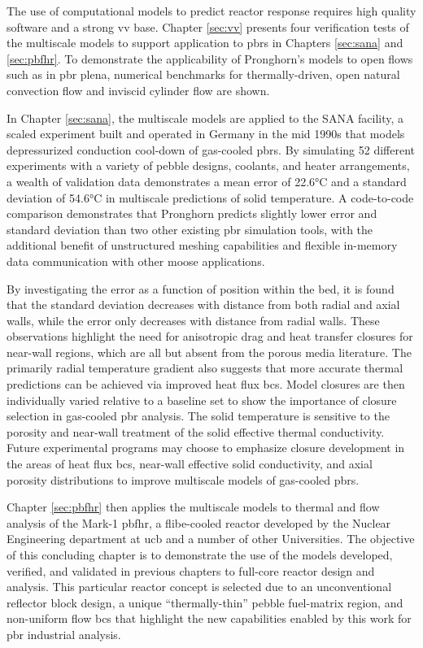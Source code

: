 The use of computational models to predict reactor response requires high quality software and a strong \gls{vv} base. Chapter \ref{sec:vv} presents four verification tests of the multiscale models to support application to \glspl{pbr} in Chapters \ref{sec:sana} and \ref{sec:pbfhr}. To demonstrate the applicability of Pronghorn's models to open flows such as in \gls{pbr} plena, numerical benchmarks for thermally-driven, open natural convection flow and inviscid cylinder flow are shown.

In Chapter \ref{sec:sana}, the multiscale models are applied to the SANA facility, a scaled experiment built and operated in Germany in the mid 1990s that models depressurized conduction cool-down of gas-cooled \glspl{pbr}. By simulating 52 different experiments with a variety of pebble designs, coolants, and heater arrangements, a wealth of validation data demonstrates a mean error of 22.6\si{\celsius} and a standard deviation of 54.6\si{\celsius} in multiscale predictions of solid temperature. A code-to-code comparison demonstrates that Pronghorn predicts slightly lower error and standard deviation than two other existing \gls{pbr} simulation tools, with the additional benefit of unstructured meshing capabilities and flexible in-memory data communication with other \gls{moose} applications.

By investigating the error as a function of position within the bed, it is found that the standard deviation decreases with distance from both radial and axial walls, while the error only decreases with distance from radial walls. These observations highlight the need for anisotropic drag and heat transfer closures for near-wall regions, which are all but absent from the porous media literature. The primarily radial temperature gradient also suggests that more accurate thermal predictions can be achieved via improved heat flux \glspl{bc}. Model closures are then individually varied relative to a baseline set to show the importance of closure selection in gas-cooled \gls{pbr} analysis. The solid temperature is sensitive to the porosity and near-wall treatment of the solid effective thermal conductivity. Future experimental programs may choose to emphasize closure development in the areas of heat flux \glspl{bc}, near-wall effective solid conductivity, and axial porosity distributions to improve multiscale models of gas-cooled \glspl{pbr}.

Chapter \ref{sec:pbfhr} then applies the multiscale models to thermal and flow analysis of the Mark-1 \gls{pbfhr}, a \gls{flibe}-cooled reactor developed by the Nuclear Engineering department at \gls{ucb} and a number of other Universities. The objective of this concluding chapter is to demonstrate the use of the models developed, verified, and validated in previous chapters to full-core reactor design and analysis. This particular reactor concept is selected due to an unconventional reflector block design, a unique ``thermally-thin'' pebble fuel-matrix region, and non-uniform flow \glspl{bc} that highlight the new capabilities enabled by this work for \gls{pbr} industrial analysis.

